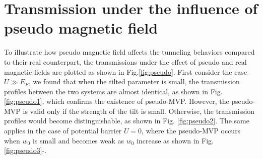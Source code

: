    
\section{Transmission under the influence of pseudo magnetic field}
    To illustrate how pseudo magnetic field affects the tunneling behaviors compared to their real counterpart,
    the transmissions under the effect of pseudo and real magnetic fields are plotted as shown in Fig.\ref{fig:pseudo}.
    First consider the case $U \gg E_F$, we found that when the tilted parameter is small, the transmission profiles between the two systems are almost identical, as shown in Fig. \ref{fig:pseudo1}, which confirms the existence of pseudo-MVP. 
    However, the pseudo-MVP is valid only if the strength of the tilt is small. 
    Otherwise, the transmission profiles would become distinguishable, as shown in Fig. \ref{fig:pseudo2}. 
    The same applies in the case of potential barrier $U=0$, where the pseudo-MVP occurs when $w_0$ is small and becomes weak as $w_0$ increase as shown in Fig. \ref{fig:pseudo3}-. 

